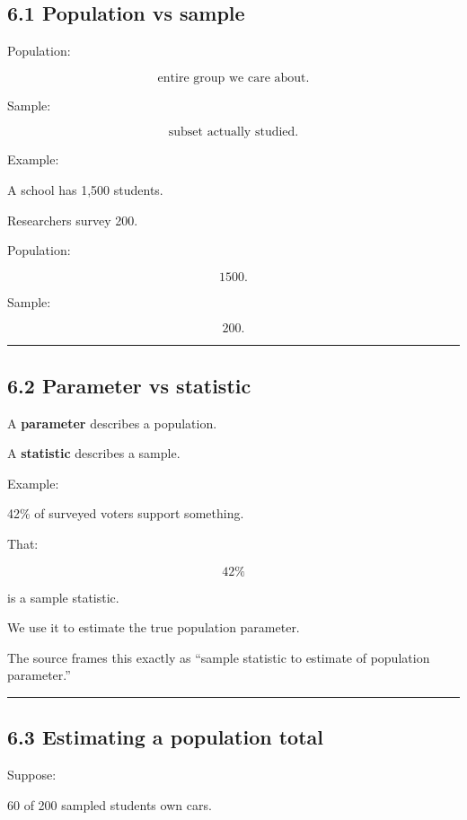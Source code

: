\documentclass[
]{article}
\begin{document}
\subsection{6.1 Population vs sample}\label{population-vs-sample}

Population:

\[
\boxed{\text{entire group we care about}}.
\]

Sample:

\[
\boxed{\text{subset actually studied}}.
\]

Example:

A school has 1,500 students.

Researchers survey 200.

Population:

\[
1500.
\]

Sample:

\[
200.
\]

\begin{center}\rule{0.5\linewidth}{0.5pt}\end{center}

\subsection{6.2 Parameter vs statistic}\label{parameter-vs-statistic}

A \textbf{parameter} describes a population.

A \textbf{statistic} describes a sample.

Example:

42\% of surveyed voters support something.

That:

\[
42\%
\]

is a sample statistic.

We use it to estimate the true population parameter.

The source frames this exactly as ``sample statistic to estimate of
population parameter.''

\begin{center}\rule{0.5\linewidth}{0.5pt}\end{center}

\subsection{6.3 Estimating a population
total}\label{estimating-a-population-total}

Suppose:

60 of 200 sampled students own cars.
\end{document}
